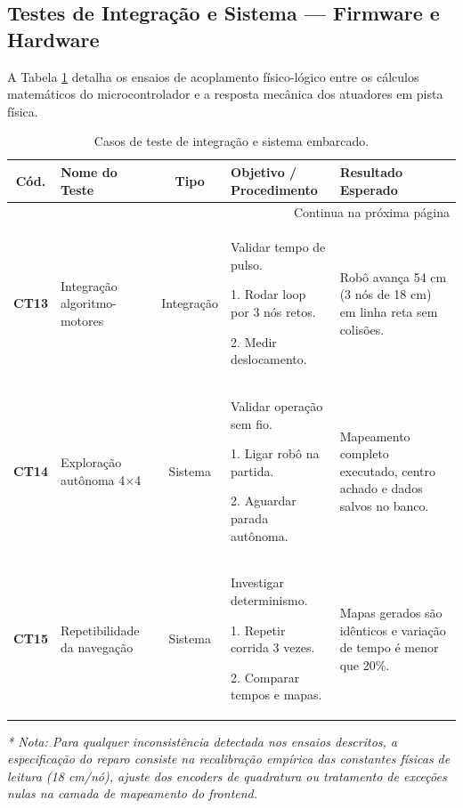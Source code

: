 \begin{landscape}
\subsection*{Testes de Integração e Sistema — Firmware e Hardware}
A Tabela \ref{tab:testes_integracao_firm} detalha os ensaios de acoplamento físico-lógico entre os cálculos matemáticos do microcontrolador e a resposta mecânica dos atuadores em pista física.

\begin{center}
\begin{longtable}{|c|p{4.5cm}|c|p{8cm}|p{6cm}|}
\caption{Casos de teste de integração e sistema embarcado.} \label{tab:testes_integracao_firm} \\
\hline
\textbf{Cód.} & \textbf{Nome do Teste} & \textbf{Tipo} & \textbf{Objetivo / Procedimento} & \textbf{Resultado Esperado} \\ \hline
\endhead
\hline \multicolumn{5}{|r|}{{Continua na próxima página}} \\ \hline
\endfoot
\hline \hline
\endlastfoot

\textbf{CT13} & Integração algoritmo-motores & Integração & Validar tempo de pulso. \par 1. Rodar loop por 3 nós retos. \par 2. Medir deslocamento. & Robô avança 54 cm (3 nós de 18 cm) em linha reta sem colisões. \\ \hline
\textbf{CT14} & Exploração autônoma 4×4 & Sistema & Validar operação sem fio. \par 1. Ligar robô na partida. \par 2. Aguardar parada autônoma. & Mapeamento completo executado, centro achado e dados salvos no banco. \\ \hline
\textbf{CT15} & Repetibilidade da navegação & Sistema & Investigar determinismo. \par 1. Repetir corrida 3 vezes. \par 2. Comparar tempos e mapas. & Mapas gerados são idênticos e variação de tempo é menor que 20\%. \\ \hline
\end{longtable}
\end{center}

\textit{* Nota: Para qualquer inconsistência detectada nos ensaios descritos, a especificação do reparo consiste na recalibração empírica das constantes físicas de leitura (18 cm/nó), ajuste dos encoders de quadratura ou tratamento de exceções nulas na camada de mapeamento do frontend.}

\end{landscape}
